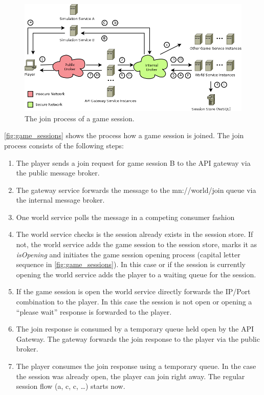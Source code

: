 \begin{figure}
	\centering
  	\includegraphics[width=\textwidth]{images/architecture/GameSessions}
	\caption{The join process of a game session.}
	\label{fig:game_sessions}
\end{figure}

\autoref{fig:game_sessions} shows the process how a game session is joined.
The join process consists of the following steps:

\begin{enumerate}
  \item The player sends a join request for game session B to the API gateway
  via the public message broker.
  \item The gateway service forwards the message to the mn://world/join queue
  via the internal message broker.
  \item One world service polls the message in a competing consumer fashion
  \item The world service checks is the session already exists in the session
  store. If not, the world service adds the game session to the session store,
  marks it as \textit{isOpening} and initiates the game session opening process (capital
  letter sequence in \autoref{fig:game_sessions}). In this case or if the
  session is currently opening the world service adds the player to a waiting
  queue for the session.
  \item If the game session is open the world service directly
  forwards the IP/Port combination to the player.  In this case the session is
  not open or opening a ``please wait'' response is forwarded to the player.
  \item The join response is consumed by a temporary queue held open by the API
  Gateway. The gateway forwards the join response to the player via the public
  broker.
  \item The player consumes the join response using a temporary queue. In the
  case the session was already open, the player can join right away. The regular
  session flow (a, c, c, \ldots) starts now.
\end{enumerate}

